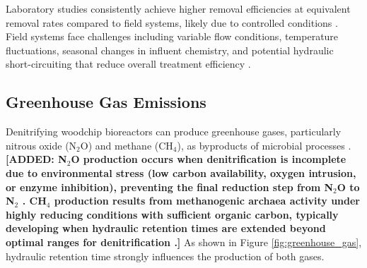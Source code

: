 \documentclass[12pt,a4paper]{article}
\newcommand{\added}[1]{\textcolor{addedtext}{\textbf{[ADDED: #1]}}}
\begin{document}
Laboratory studies consistently achieve higher removal efficiencies at equivalent removal rates compared to field systems, likely due to controlled conditions \citep{RN611}. Field systems face challenges including variable flow conditions, temperature fluctuations, seasonal changes in influent chemistry, and potential hydraulic short-circuiting that reduce overall treatment efficiency \citep{RN312, RN309}.

\subsection{Greenhouse Gas Emissions}

Denitrifying woodchip bioreactors can produce greenhouse gases, particularly nitrous oxide (N$_{2}$O) and methane (CH$_{4}$), as byproducts of microbial processes \citep{RN1181, RN611}. \added{N$_{2}$O production occurs when denitrification is incomplete due to environmental stress (low carbon availability, oxygen intrusion, or enzyme inhibition), preventing the final reduction step from N$_{2}$O to N$_{2}$ \citep{RN708}. CH$_{4}$ production results from methanogenic archaea activity under highly reducing conditions with sufficient organic carbon, typically developing when hydraulic retention times are extended beyond optimal ranges for denitrification \citep{RN708}.} As shown in Figure \ref{fig:greenhouse_gas}, hydraulic retention time strongly influences the production of both gases.
\end{document}
